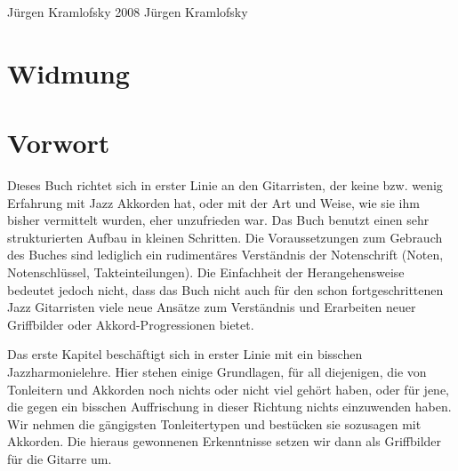 \documentclass[BCOR12mm,DIV11,headings=normal]{scrbook}
\title{\mytitle}
\author{\myauthor}
\newcommand\mycopyright{2008 Jürgen Kramlofsky}
\begin{document}
%
%




\maketitle
\clearpage

\vspace*{\fill}

\setlength{\parindent}{0pt}

\ifx\mycopyright\undefined
\else
	\textcopyright{} \mycopyright
\fi


\setlength{\parindent}{1em}
\clearpage

\tableofcontents
\listoffigures			%


%
%


\setlength{\parindent}{1em}

\mainmatter
{}

\chapter{Widmung}
\label{widmung}



\chapter{Vorwort}
\label{vorwort}

\lettrine{D}ieses Buch richtet sich in erster Linie an den Gitarristen, der keine bzw. wenig Erfahrung mit Jazz Akkorden hat, oder mit der Art und Weise, wie sie ihm bisher vermittelt wurden, eher unzufrieden war. Das Buch benutzt einen sehr strukturierten Aufbau in kleinen Schritten. Die Voraussetzungen zum Gebrauch des Buches sind lediglich ein rudimentäres Verständnis der Notenschrift (Noten, Notenschlüssel, Takteinteilungen). Die Einfachheit der Herangehensweise bedeutet jedoch nicht, dass das Buch nicht auch für den schon fortgeschrittenen Jazz Gitarristen viele neue Ansätze zum Verständnis und Erarbeiten neuer Griffbilder oder Akkord-Progressionen bietet.

Das erste Kapitel beschäftigt sich in erster Linie mit ein bisschen Jazzharmonielehre. Hier stehen einige Grundlagen, für all diejenigen, die von Tonleitern und Akkorden noch nichts oder nicht viel gehört haben, oder für jene, die gegen ein bisschen Auffrischung in dieser Richtung nichts einzuwenden haben. Wir nehmen die gängigsten Tonleitertypen und bestücken sie sozusagen mit Akkorden. Die hieraus gewonnenen Erkenntnisse setzen wir dann als Griffbilder für die Gitarre um.
\end{document}
